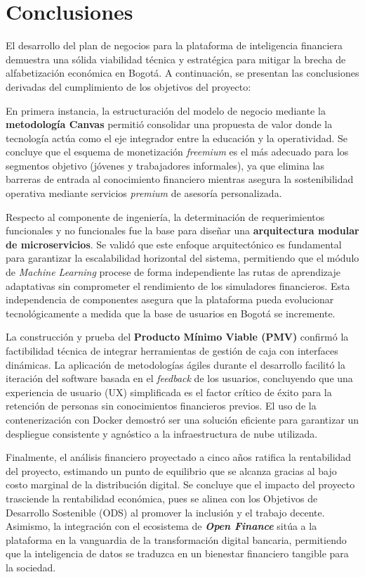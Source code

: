 {}
\section*{Conclusiones}

El desarrollo del plan de negocios para la plataforma de inteligencia financiera demuestra una sólida viabilidad técnica y estratégica para mitigar la brecha de alfabetización económica en Bogotá. A continuación, se presentan las conclusiones derivadas del cumplimiento de los objetivos del proyecto:

En primera instancia, la estructuración del modelo de negocio mediante la \textbf{metodología Canvas} permitió consolidar una propuesta de valor donde la tecnología actúa como el eje integrador entre la educación y la operatividad. Se concluye que el esquema de monetización \textit{freemium} es el más adecuado para los segmentos objetivo (jóvenes y trabajadores informales), ya que elimina las barreras de entrada al conocimiento financiero mientras asegura la sostenibilidad operativa mediante servicios \textit{premium} de asesoría personalizada.

Respecto al componente de ingeniería, la determinación de requerimientos funcionales y no funcionales fue la base para diseñar una \textbf{arquitectura modular de microservicios}. Se validó que este enfoque arquitectónico es fundamental para garantizar la escalabilidad horizontal del sistema, permitiendo que el módulo de \textit{Machine Learning} procese de forma independiente las rutas de aprendizaje adaptativas sin comprometer el rendimiento de los simuladores financieros. Esta independencia de componentes asegura que la plataforma pueda evolucionar tecnológicamente a medida que la base de usuarios en Bogotá se incremente.

La construcción y prueba del \textbf{Producto Mínimo Viable (PMV)} confirmó la factibilidad técnica de integrar herramientas de gestión de caja con interfaces dinámicas. La aplicación de metodologías ágiles durante el desarrollo facilitó la iteración del software basada en el \textit{feedback} de los usuarios, concluyendo que una experiencia de usuario (UX) simplificada es el factor crítico de éxito para la retención de personas sin conocimientos financieros previos. El uso de la contenerización con Docker demostró ser una solución eficiente para garantizar un despliegue consistente y agnóstico a la infraestructura de nube utilizada.

Finalmente, el análisis financiero proyectado a cinco años ratifica la rentabilidad del proyecto, estimando un punto de equilibrio que se alcanza gracias al bajo costo marginal de la distribución digital. Se concluye que el impacto del proyecto trasciende la rentabilidad económica, pues se alinea con los Objetivos de Desarrollo Sostenible (ODS) al promover la inclusión y el trabajo decente. Asimismo, la integración con el ecosistema de \textbf{\textit{Open Finance}} sitúa a la plataforma en la vanguardia de la transformación digital bancaria, permitiendo que la inteligencia de datos se traduzca en un bienestar financiero tangible para la sociedad.